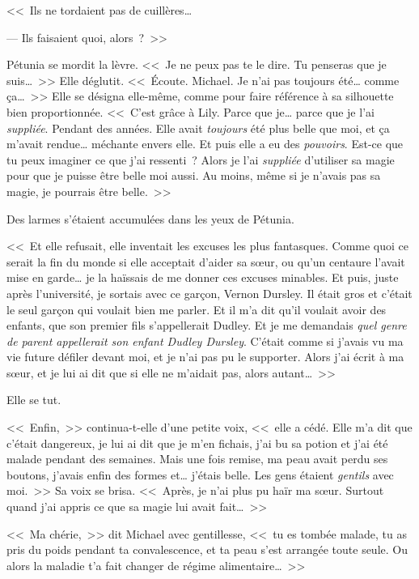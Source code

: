 <<~Ils ne tordaient pas de cuillères\ldots

--- Ils faisaient quoi, alors~?~>>

Pétunia se mordit la lèvre. <<~Je ne peux pas te le dire. Tu penseras que je suis\ldots~>> Elle déglutit. <<~Écoute. Michael. Je n'ai pas toujours été\ldots{} comme ça\ldots~>> Elle se désigna elle-même, comme pour faire référence à sa silhouette bien proportionnée. <<~C'est grâce à Lily. Parce que je\ldots{} parce que je l'ai \emph{suppliée}. Pendant des années. Elle avait \emph{toujours} été plus belle que moi, et ça m'avait rendue\ldots{} méchante envers elle. Et puis elle a eu des \emph{pouvoirs}. Est-ce que tu peux imaginer ce que j'ai ressenti~? Alors je l'ai \emph{suppliée} d'utiliser sa magie pour que je puisse être belle moi aussi. Au moins, même si je n'avais pas sa magie, je pourrais être belle.~>>

Des larmes s'étaient accumulées dans les yeux de Pétunia.

<<~Et elle refusait, elle inventait les excuses les plus fantasques. Comme quoi ce serait la fin du monde si elle acceptait d'aider sa s\oe{}ur, ou qu'un centaure l'avait mise en garde\ldots{} je la haïssais de me donner ces excuses minables. Et puis, juste après l'université, je sortais avec ce garçon, Vernon Dursley. Il était gros et c'était le seul garçon qui voulait bien me parler. Et il m'a dit qu'il voulait avoir des enfants, que son premier fils s'appellerait Dudley. Et je me demandais \emph{quel genre de parent appellerait son enfant Dudley Dursley}. C'était comme si j'avais vu ma vie future défiler devant moi, et je n'ai pas pu le supporter. Alors j'ai écrit à ma s\oe{}ur, et je lui ai dit que si elle ne m'aidait pas, alors autant\ldots~>>

Elle se tut.

<<~Enfin,~>> continua-t-elle d'une petite voix, <<~elle a cédé. Elle m'a dit que c'était dangereux, je lui ai dit que je m'en fichais, j'ai bu sa potion et j'ai été malade pendant des semaines. Mais une fois remise, ma peau avait perdu ses boutons, j'avais enfin des formes et\ldots{} j'étais belle. Les gens étaient \emph{gentils} avec moi.~>> Sa voix se brisa. <<~Après, je n'ai plus pu haïr ma s\oe{}ur. Surtout quand j'ai appris ce que sa magie lui avait fait\ldots~>>

<<~Ma chérie,~>> dit Michael avec gentillesse, <<~tu es tombée malade, tu as pris du poids pendant ta convalescence, et ta peau s'est arrangée toute seule. Ou alors la maladie t'a fait changer de régime alimentaire\ldots~>>

